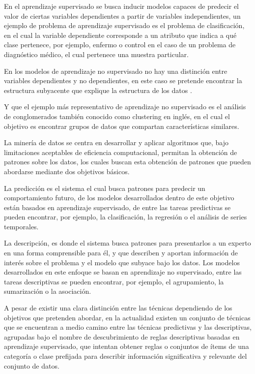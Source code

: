 En el aprendizaje supervisado se busca inducir modelos capaces de predecir el valor de ciertas variables dependientes a partir de variables independientes, un ejemplo de problema de aprendizaje supervisado es el problema de clasificación, en el cual la variable dependiente corresponde a un atributo que indica a qué clase pertenece, por ejemplo, enfermo o control en el caso de un problema de diagnóstico médico, el cual pertenece una muestra particular. 

En los modelos de aprendizaje no supervisado no hay una distinción entre variables dependientes y no dependientes, en este caso se pretende encontrar la estructura subyacente que explique la estructura de los datos \cite{gonzalez2015}. 

Y que el ejemplo más representativo de aprendizaje no supervisado es el análisis de conglomerados también conocido como clustering en inglés, en el cual el objetivo es encontrar grupos de datos que compartan características similares. 

La minería de datos se centra en desarrollar y aplicar algoritmos que, bajo limitaciones aceptables de eficiencia computacional, permitan la obtención de patrones sobre los datos, los cuales buscan esta obtención de patrones que pueden abordarse mediante dos objetivos básicos.

La predicción es el sistema el cual busca patrones para predecir un comportamiento futuro, de los modelos desarrollados dentro de este objetivo están basados en aprendizaje supervisado, de entre las tareas predictivas se pueden encontrar, por ejemplo, la clasificación, la regresión o el análisis de series temporales. 

La descripción, es donde el sistema busca patrones para presentarlos a un experto en una forma comprensible para él, y que describen y aportan información de interés sobre el problema y el modelo que subyace bajo los datos. Los modelos desarrollados en este enfoque se basan en aprendizaje no supervisado, entre las tareas descriptivas se pueden encontrar, por ejemplo, el agrupamiento, la sumarización o la asociación.

A pesar de existir una clara distinción entre las técnicas dependiendo de los objetivos que pretenden abordar, en la actualidad existen un conjunto de técnicas que se encuentran a medio camino entre las técnicas predictivas y las descriptivas, agrupadas bajo el nombre de descubrimiento de reglas descriptivas basadas en aprendizaje supervisado, que intentan obtener reglas o conjuntos de ítems de una categoría o clase prefijada para describir información significativa y relevante del conjunto de datos. 

